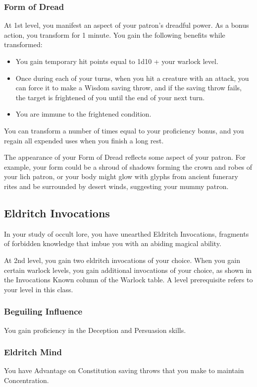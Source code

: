 \documentclass[letterpaper,openany,oneside,twocolumn]{book}
\begin{document}
\subsubsection{Form of Dread}
At 1st level, you manifest an aspect of your patron's dreadful power. As a bonus action, you transform for 1 minute. You gain the following benefits while transformed:
\begin{itemize}
	\item You gain temporary hit points equal to 1d10 + your warlock level.
	\item Once during each of your turns, when you hit a creature with an attack, you can force it to make a Wisdom saving throw, and if the saving throw fails, the target is frightened of you until the end of your next turn.
	\item You are immune to the frightened condition.
\end{itemize}
You can transform a number of times equal to your proficiency bonus, and you regain all expended uses when you finish a long rest.

The appearance of your Form of Dread reflects some aspect of your patron. For example, your form could be a shroud of shadows forming the crown and robes of your lich patron, or your body might glow with glyphs from ancient funerary rites and be surrounded by desert winds, suggesting your mummy patron.
\subsection*{Eldritch Invocations}
In your study of occult lore, you have unearthed Eldritch Invocations, fragments of forbidden knowledge that imbue you with an abiding magical ability.

At 2nd level, you gain two eldritch invocations of your choice. When you gain certain warlock levels, you gain additional invocations of your choice, as shown in the Invocations Known column of the Warlock table. A level prerequisite refers to your level in this class.
\subsubsection*{Beguiling Influence}
You gain proficiency in the Deception and Persuasion skills.
\subsubsection*{Eldritch Mind}
You have Advantage on Constitution saving throws that you make to maintain Concentration.
\end{document}
